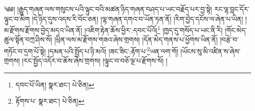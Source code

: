 \setcounter{footnote}{0} 
༄༅། །རྒྱུད་གཞན་ལས་གསུངས་པའི་ལྟུང་བའི་མཚན་ཉིད་གཞན་བཤད་པ་ཡང་བརྗོད་པར་བྱ་སྟེ། རང་ལྷ་བླང་དོར་ལྟུང་བ་མིག །དེ་ཉིད་དུས་འདས་རི་བོང་ཅན། །ལྷ་གཞན་དགའ་བ་ཡོན་ཏན་ནོ། །རིག་བྱེད་དངོས་ལ་ཞེན་པ་ཡིན། །མ་རྫོགས་རྫོགས་བྱེད་མདའ་ཡིན་ནོ། །འཇིག་རྟེན་ཆོས་ཕྱིར་:དབང་པོའོ།\footnote{དབང་པོ་ཡིན།  སྣར་ཐང་།  པེ་ཅིན། } །ཁྱད་དུ་གསོད་པ་ཡང་ནི་རི། །གོང་མེད་ཚུལ་སྟོན་བཀྲ་ཤིས་སོ། །ཕྲིན་ལས་མ་རྫོགས་གཟའ་ཞེས་གྲགས། །དོན་མེད་གནས་པ་ཕྱོགས་ཡིན་ནོ། །བརྩེ་བ་གཏོང་བ་དྲག་པོ་སྟེ། །དམན་པའི་སྤྱོད་པ་ཉི་མའོ། །ཟང་ཟིང་:རྟོག་པ་\footnote{རྟོགས་པ་  སྣར་ཐང་།  པེ་ཅིན། }ཡན་ལག་གོ། །ཡོངས་སུ་མི་འཛིན་ས་ཞེས་གྲགས། །རང་སྤྱོད་འདོར་བ་ཆོས་ཞེས་གྲགས། །ལྟུང་བ་བཅོ་ལྔ་པ་རྫོགས་སོ། ། 
